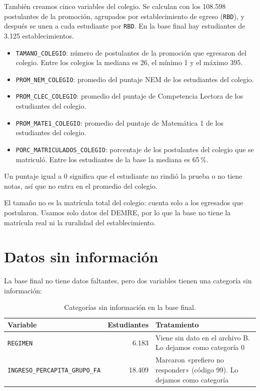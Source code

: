 \documentclass[11pt,letterpaper]{article}
\begin{document}
También creamos cinco variables del colegio. Se calculan con los 108.598 postulantes de la promoción, agrupados por establecimiento de egreso (\texttt{RBD}), y después se unen a cada estudiante por \texttt{RBD}. En la base final hay estudiantes de 3.125 establecimientos.

\begin{itemize}
\item \texttt{TAMANO\_COLEGIO}: número de postulantes de la promoción que egresaron del colegio. Entre los colegios la mediana es 26, el mínimo 1 y el máximo 395.
\item \texttt{PROM\_NEM\_COLEGIO}: promedio del puntaje NEM de los estudiantes del colegio.
\item \texttt{PROM\_CLEC\_COLEGIO}: promedio del puntaje de Competencia Lectora de los estudiantes del colegio.
\item \texttt{PROM\_MATE1\_COLEGIO}: promedio del puntaje de Matemática 1 de los estudiantes del colegio.
\item \texttt{PORC\_MATRICULADOS\_COLEGIO}: porcentaje de los postulantes del colegio que se matriculó. Entre los estudiantes de la base la mediana es 65\,\%.
\end{itemize}

Un puntaje igual a 0 significa que el estudiante no rindió la prueba o no tiene notas, así que no entra en el promedio del colegio.

El tamaño no es la matrícula total del colegio: cuenta solo a los egresados que postularon. Usamos solo datos del DEMRE, por lo que la base no tiene la matrícula real ni la ruralidad del establecimiento.

\section{Datos sin información}

La base final no tiene datos faltantes, pero dos variables tienen una categoría sin información:

\begin{table}[h]
\centering
\begin{tabular}{p{5.5cm}rp{6.5cm}}
\toprule
Variable & Estudiantes & Tratamiento \\
\midrule
\texttt{REGIMEN} & 6.183 & Viene sin dato en el archivo B. Lo dejamos como categoría 0 \\
\texttt{INGRESO\_PERCAPITA\_GRUPO\_FA} & 18.409 & Marcaron «prefiero no responder» (código 99). Lo dejamos como categoría \\
\bottomrule
\end{tabular}
\caption{Categorías sin información en la base final.}
\end{table}
\end{document}
